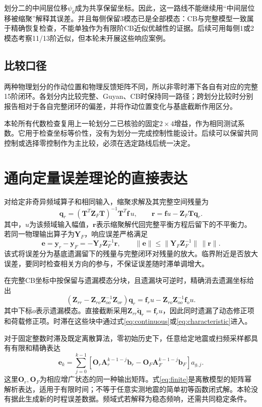 \documentclass[UTF8,11pt,a4paper]{ctexart}
\newcommand{\mat}[1]{\bm{#1}}
\begin{document}
划分二的中间层位移$\psi_6$成为共享保留坐标。因此，这一路线不能继续用“中间层位移被缩聚”解释其误差。并且每侧保留3模态已是全部模态：CB与完整模型一致属于精确恢复检查，不能单独作为有限阶CB近似优越性的证据。后续可用每侧1或2模态考察11/13阶近似，但本轮未开展这些响应案例。

\subsection{比较口径}
两种物理划分的作动位置和物理反馈矩阵不同，所以非零时滞下各自有对应的完整15阶闭环。各划分内比较完整、Guyan、CB时保持同一路径；跨划分比较时分别报告相对于各自完整闭环的偏差，并将作动位置变化与基底截断作用区分。

本轮所有代数检查复用上一轮划分二已核验的固定$2\times4$增益，作为相同测试系数。它用于检查坐标等价性，没有为划分一完成控制性能设计。后续可以保留共同控制或选择零控制作为主比较，必须在选定路线后统一决定。

\section{通向定量误差理论的直接表达}

对给定非奇异频域算子和相同输入，缩聚求解及其完整空间残量为
\begin{equation}
 \mat q_r=(\mat T^T\mat Z_F\mat T)^{-1}\mat T^T\mat f\,u,\qquad
 \mat r=\mat f u-\mat Z_F\mat T\mat q_r.
\end{equation}
其中，$u$为该频域输入幅值，$\mat r$表示缩聚解代回完整平衡方程后留下的不平衡力。若同一物理输出算子为$\mat Y_F$，响应误差严格满足
\begin{equation}\label{eq:error}
 \mat e=\mat y_r-\mat y_F=-\mat Y_F\mat Z_F^{-1}\mat r,\qquad
 \|\mat e\|\le\|\mat Y_F\mat Z_F^{-1}\|\,\|\mat r\|.
\end{equation}
该式将误差分为基底遗漏留下的残量与完整闭环对残量的放大。临界附近是否放大误差，要同时检查相关方向的参与，不保证误差随时滞单调增大。

在完整CB坐标中按保留与遗漏模态分块，且遗漏块可逆时，精确消去遗漏坐标给出
\begin{equation}\label{eq:schur}
 (\mat Z_{rr}-\mat Z_{ro}\mat Z_{oo}^{-1}\mat Z_{or})\mat q_r
 =\mat f_r u-\mat Z_{ro}\mat Z_{oo}^{-1}\mat f_o u.
\end{equation}
其中下标$o$表示遗漏模态。直接截断采用$\mat Z_{rr}\widetilde{\mat q}_r=\mat f_r u$，因此同时遗漏了动态修正项和荷载修正项。时滞在这些块中通过式\eqref{eq:continuous}或\eqref{eq:characteristic}进入。

对于固定整数时滞及既定离散算法，零初始历史下，任意给定地震或扫频采样都具有有限和精确表达
\begin{equation}\label{eq:finite}
 \mat e_k=\sum_{j=0}^{k-1}\left[
 \mat O_r\mat A_r^{k-1-j}\mat b_r-
 \mat O_F\mat A_F^{k-1-j}\mat b_F\right]a_{g,j}.
\end{equation}
这里$\mat O_r,\mat O_F$为相应增广状态的同一种输出矩阵。式\eqref{eq:finite}是离散模型的矩阵幂解析表达，适用于有限时间；不等于任意实测地震的简单初等函数闭式解。本轮没有据此生成新的时程误差数据。频域式若解释为稳态频响，还需共同稳定条件。
\end{document}
